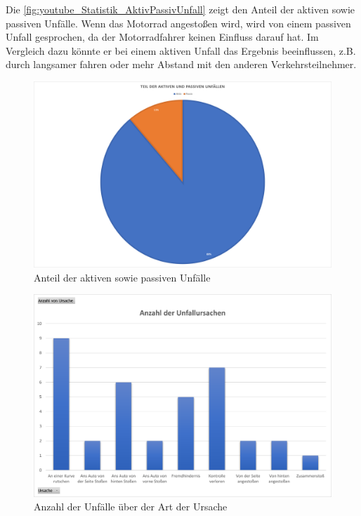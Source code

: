 Die \autoref{fig:youtube_Statistik_AktivPassivUnfall} zeigt den Anteil der aktiven sowie passiven Unfälle. Wenn das Motorrad angestoßen wird, wird von einem passiven Unfall gesprochen, da der Motorradfahrer keinen Einfluss darauf hat. Im Vergleich dazu könnte er bei einem aktiven Unfall das Ergebnis beeinflussen, z.B. durch langsamer fahren oder mehr Abstand mit den anderen Verkehrsteilnehmer.

\begin{figure}[H]
	\centering
	\includegraphics[width=\linewidth]{Bilder/youtube_Statistik_AktivPassivUnfall.png}
	\caption{Anteil der aktiven sowie passiven Unfälle}
	\label{fig:youtube_Statistik_AktivPassivUnfall}
\end{figure}

\begin{figure}[H]
	\centering
	\includegraphics[width=\linewidth]{Bilder/youtube_Statistik_AnzahlUnfallUrsachen.png}
	\caption{Anzahl der Unfälle über der Art der Ursache}
	\label{fig:youtube_Statistik_AnzahlUnfallUrsachen}
\end{figure}


